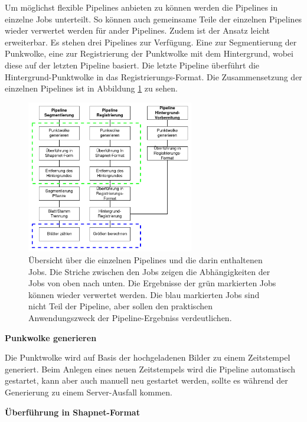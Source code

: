 \documentclass[12pt,titlepage, twoside]{article}
\begin{document}
Um möglichst flexible Pipelines anbieten zu können werden die Pipelines in einzelne Jobs unterteilt. So können auch gemeinsame Teile der einzelnen Pipelines wieder verwertet werden für ander Pipelines.
Zudem ist der Ansatz leicht erweiterbar. 
Es stehen drei Pipelines zur Verfügung. Eine zur Segmentierung der Punkwolke, eine zur Registrierung der Punktwolke mit dem Hintergrund, wobei diese auf der letzten Pipeline basiert.
Die letzte Pipeline überführt die Hintergrund-Punktwolke in das Registrierungs-Format.
Die Zusammensetzung der einzelnen Pipelines ist in Abbildung \ref{fig:Pipelines} zu sehen.

\begin{figure}
    \centering
    \includegraphics[width=0.65\textwidth]{./Images/Pipelines.png}
    \caption{Übersicht über die einzelnen Pipelines und die darin enthaltenen Jobs. Die Striche zwischen den Jobs zeigen die Abhängigkeiten der Jobs von oben nach unten.
    Die Ergebnisse der grün markierten Jobs können wieder verwertet werden. 
    Die blau markierten Jobs sind nicht Teil der Pipeline, aber sollen den praktischen Anwendungszweck der Pipeline-Ergebniss verdeutlichen.}
    \label{fig:Pipelines}
\end{figure}

\textbf{Punkwolke generieren}

Die Punktwolke wird auf Basis der hochgeladenen Bilder zu einem Zeitstempel generiert. 
Beim Anlegen eines neuen Zeitstempels wird die Pipeline automatisch gestartet, kann aber auch manuell neu gestartet werden, sollte es während der Generierung zu einem Server-Ausfall kommen.

\textbf{Überführung in Shapnet-Format}

\end{document}
